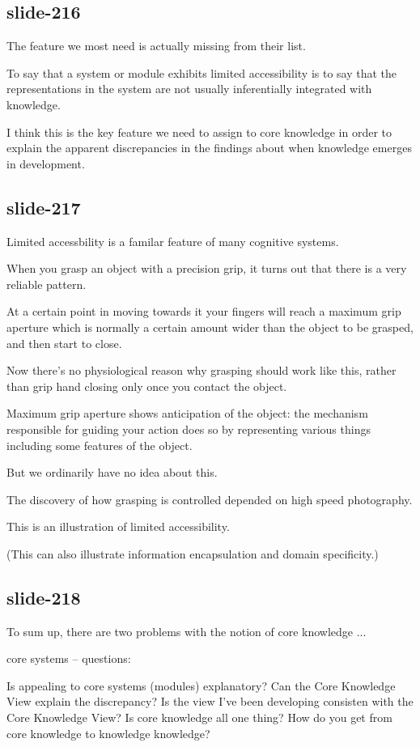\documentclass[12pt,\papersize]{extarticle}
\begin{document}
\subsection{slide-216}
The feature we most need is actually missing from their list.
 
To say that a system or module exhibits limited accessibility is to say that the representations in the system are not usually inferentially integrated with knowledge.
 
I think this is the key feature we need to assign to core knowledge in order to explain the apparent discrepancies in the findings about when knowledge emerges in development.
 
\subsection{slide-217}
Limited accessbility is a familar feature of many cognitive systems.
 
When you grasp an object with a precision grip, it turns out that there is a very reliable pattern.
 
At a certain point in moving towards it your fingers will reach a maximum grip aperture which is normally a certain amount wider than the object to be grasped, and then start to close.
 
Now there's no physiological reason why grasping should work like this, rather than grip hand closing only once you contact the object.
 
Maximum grip aperture shows anticipation of the object: the mechanism responsible for guiding your action does so by representing various things including some features of the object.
 
But we ordinarily have no idea about this.
 
The discovery of how grasping is controlled depended on high speed photography.
 
This is an illustration of limited accessibility.
 
(This can also illustrate information encapsulation and domain specificity.)
 
\subsection{slide-218}
To sum up, there are two problems with the notion of core knowledge ...
 
core systems -- questions:

Is appealing to core systems (modules) explanatory?
Can the Core Knowledge View explain the discrepancy?
Is the view I've been developing consisten with the Core Knowledge View?
Is core knowledge all one thing?
How do you get from core knowledge to knowledge knowledge?
 
\end{document}
